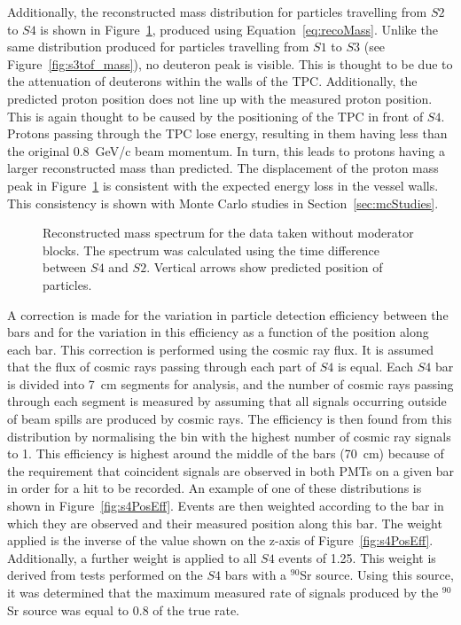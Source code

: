 Additionally, the reconstructed mass distribution for particles travelling from $\mathit{S2}$ to $\mathit{S4}$ is shown in Figure~\ref{fig:s4tof_mass}, produced using Equation~\ref{eq:recoMass}.
Unlike the same distribution produced for particles travelling from $\mathit{S1}$ to $\mathit{S3}$ (see Figure~\ref{fig:s3tof_mass}), no deuteron peak is visible.
This is thought to be due to the attenuation of deuterons within the walls of the TPC.
Additionally, the predicted proton position does not line up with the measured proton position. 
This is again thought to be caused by the positioning of the TPC in front of $\mathit{S4}$.
Protons passing through the TPC lose energy, resulting in them having less than the original 0.8~GeV/c beam momentum.
In turn, this leads to protons having a larger reconstructed mass than predicted.
The displacement of the proton mass peak in Figure~\ref{fig:s4tof_mass} is consistent with the expected energy loss in the vessel walls.
This consistency is shown with Monte Carlo studies in Section~\ref{sec:mcStudies}.

\begin{figure}[ht]
  \centering
  \begin{adjustbox}{max totalsize={.9\textwidth}{.5\textheight},center}
    
  \end{adjustbox}
  \caption{Reconstructed mass spectrum for the data taken without moderator blocks. The spectrum was calculated using the time difference between $\mathit{S4}$ and $\mathit{S2}$. Vertical arrows show predicted position of particles.}
  \label{fig:s4tof_mass}
\end{figure}

A correction is made for the variation in particle detection efficiency between the bars and for the variation in this efficiency as a function of the position along each bar.
This correction is performed using the cosmic ray flux.
It is assumed that the flux of cosmic rays passing through each part of $\mathit{S4}$ is equal.
Each $\mathit{S4}$ bar is divided into 7~cm segments for analysis, and the number of cosmic rays passing through each segment is measured by assuming that all signals occurring outside of beam spills are produced by cosmic rays.
The efficiency is then found from this distribution by normalising the bin with the highest number of cosmic ray signals to 1.
This efficiency is highest around the middle of the bars (70~cm) because of the requirement that coincident signals are observed in both PMTs on a given bar in order for a hit to be recorded.
An example of one of these distributions is shown in Figure~\ref{fig:s4PosEff}.
Events are then weighted according to the bar in which they are observed and their measured position along this bar.
The weight applied is the inverse of the value shown on the z-axis of Figure~\ref{fig:s4PosEff}.
Additionally, a further weight is applied to all $\mathit{S4}$ events of 1.25.
This weight is derived from tests performed on the $\mathit{S4}$ bars with a $^{90}$Sr source.
Using this source, it was determined that the maximum measured rate of signals produced by the $^{90}$Sr source was equal to 0.8 of the true rate.

